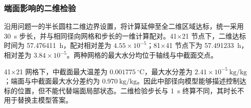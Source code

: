 \subsubsection{端面影响的二维检验}

沿用问题一的半长圆柱二维边界设置，将计算延伸至全二维区域达标，统一采用 30~s 步长，并与相同径向网格和步长的一维计算配对。41$\times$21 节点下，二维达标时间为 57.476411~h，配对相对差为 $4.55\times10^{-5}$；81$\times$41 节点下为 57.491233~h，相对差为 $3.84\times10^{-5}$。两种网格的最大水分均位于轴线与中截面交点。

41$\times$21 网格下，中截面最大温差为 $0.001775~{}^\circ\mathrm C$，最大水分差为 $2.41\times10^{-5}~\mathrm{kg/kg}$；端面与中截面最大水分差约为 $0.970~\mathrm{kg/kg}$。因此中部径向模型能够描述控制达标的位置，但不能代替端面局部状态。二维检验步长与 1~s 终算不同，其时长不用于替换主模型答案。
